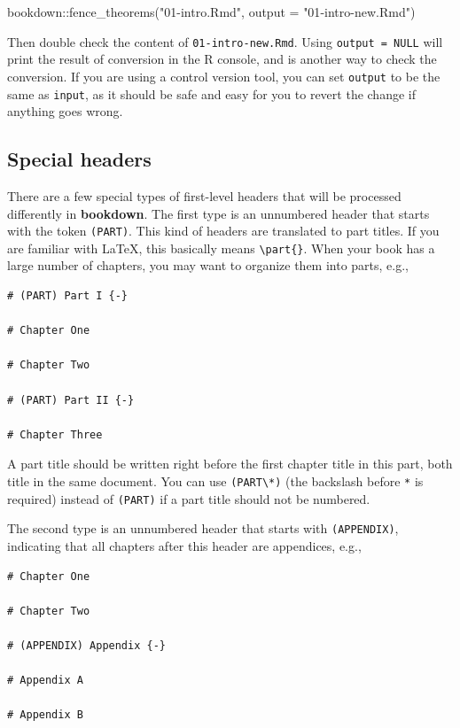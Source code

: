 \documentclass[
  12pt,
]{krantz}
\newenvironment{Shaded}{\begin{snugshade}}{\end{snugshade}}
\newcommand{\AttributeTok}[1]{\textcolor[rgb]{0.77,0.63,0.00}{#1}}
\newcommand{\FunctionTok}[1]{\textcolor[rgb]{0.00,0.00,0.00}{#1}}
\newcommand{\NormalTok}[1]{#1}
\newcommand{\SpecialCharTok}[1]{\textcolor[rgb]{0.00,0.00,0.00}{#1}}
\newcommand{\StringTok}[1]{\textcolor[rgb]{0.31,0.60,0.02}{#1}}
\theoremstyle{definition}
\theoremstyle{definition}
\theoremstyle{definition}
\theoremstyle{definition}
\theoremstyle{remark}
\begin{document}
\begin{Shaded}
\begin{Highlighting}[]
\NormalTok{bookdown}\SpecialCharTok{::}\FunctionTok{fence\_theorems}\NormalTok{(}\StringTok{"01{-}intro.Rmd"}\NormalTok{, }\AttributeTok{output =} \StringTok{"01{-}intro{-}new.Rmd"}\NormalTok{)}
\end{Highlighting}
\end{Shaded}

Then double check the content of \texttt{01-intro-new.Rmd}. Using \texttt{output\ =\ NULL} will print the result of conversion in the R console, and is another way to check the conversion. If you are using a control version tool, you can set \texttt{output} to be the same as \texttt{input}, as it should be safe and easy for you to revert the change if anything goes wrong.

\hypertarget{special-headers}{%
\subsection{Special headers}\label{special-headers}}

There are a few special types of first-level headers that will be processed differently in \textbf{bookdown}. The first type is an unnumbered header that starts with the token \texttt{(PART)}. This kind of headers are translated to part titles. If you are familiar with LaTeX, this basically means \texttt{\textbackslash{}part\{\}}. When your book has a large number of chapters, you may want to organize them into parts, e.g.,

\begin{verbatim}
# (PART) Part I {-} 

# Chapter One

# Chapter Two

# (PART) Part II {-} 

# Chapter Three
\end{verbatim}

A part title should be written right before the first chapter title in this part, both title in the same document. You can use \texttt{(PART\textbackslash{}*)} (the backslash before \texttt{*} is required) instead of \texttt{(PART)} if a part title should not be numbered.

The second type is an unnumbered header that starts with \texttt{(APPENDIX)}, indicating that all chapters after this header are appendices, e.g.,

\begin{verbatim}
# Chapter One 

# Chapter Two

# (APPENDIX) Appendix {-} 

# Appendix A

# Appendix B
\end{verbatim}
\end{document}
